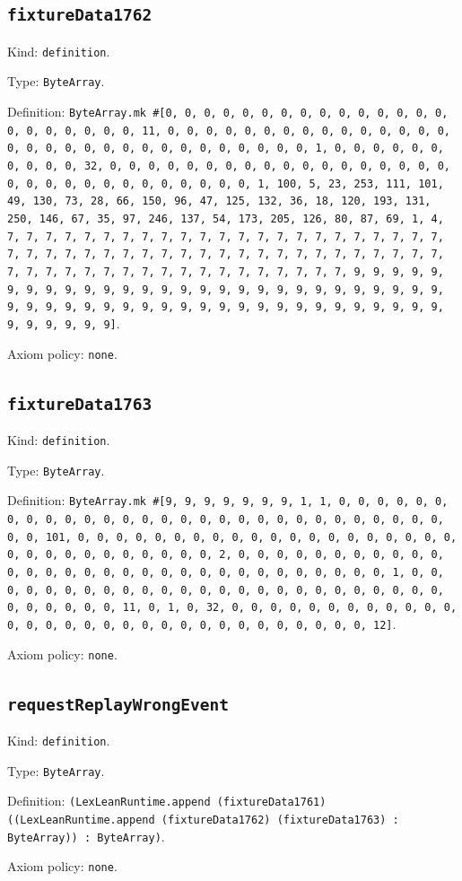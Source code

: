 \documentclass[11pt]{article}
\begin{document}
\subsection*{\texttt{fixtureData1762}}
\noindent Kind: \texttt{definition}.\par
\noindent Type: \texttt{ByteArray}.\par
\noindent Definition: \texttt{ByteArray.mk \#[0, 0, 0, 0, 0, 0, 0, 0, 0, 0, 0, 0, 0, 0, 0, 0, 0, 0, 0, 0, 0, 0, 11, 0, 0, 0, 0, 0, 0, 0, 0, 0, 0, 0, 0, 0, 0, 0, 0, 0, 0, 0, 0, 0, 0, 0, 0, 0, 0, 0, 0, 0, 0, 0, 1, 0, 0, 0, 0, 0, 0, 0, 0, 0, 0, 32, 0, 0, 0, 0, 0, 0, 0, 0, 0, 0, 0, 0, 0, 0, 0, 0, 0, 0, 0, 0, 0, 0, 0, 0, 0, 0, 0, 0, 0, 0, 0, 1, 100, 5, 23, 253, 111, 101, 49, 130, 73, 28, 66, 150, 96, 47, 125, 132, 36, 18, 120, 193, 131, 250, 146, 67, 35, 97, 246, 137, 54, 173, 205, 126, 80, 87, 69, 1, 4, 7, 7, 7, 7, 7, 7, 7, 7, 7, 7, 7, 7, 7, 7, 7, 7, 7, 7, 7, 7, 7, 7, 7, 7, 7, 7, 7, 7, 7, 7, 7, 7, 7, 7, 7, 7, 7, 7, 7, 7, 7, 7, 7, 7, 7, 7, 7, 7, 7, 7, 7, 7, 7, 7, 7, 7, 7, 7, 7, 7, 7, 7, 7, 7, 9, 9, 9, 9, 9, 9, 9, 9, 9, 9, 9, 9, 9, 9, 9, 9, 9, 9, 9, 9, 9, 9, 9, 9, 9, 9, 9, 9, 9, 9, 9, 9, 9, 9, 9, 9, 9, 9, 9, 9, 9, 9, 9, 9, 9, 9, 9, 9, 9, 9, 9, 9, 9, 9, 9, 9, 9]}.\par
\noindent Axiom policy: \texttt{none}.\par
\subsection*{\texttt{fixtureData1763}}
\noindent Kind: \texttt{definition}.\par
\noindent Type: \texttt{ByteArray}.\par
\noindent Definition: \texttt{ByteArray.mk \#[9, 9, 9, 9, 9, 9, 9, 1, 1, 0, 0, 0, 0, 0, 0, 0, 0, 0, 0, 0, 0, 0, 0, 0, 0, 0, 0, 0, 0, 0, 0, 0, 0, 0, 0, 0, 0, 0, 0, 0, 101, 0, 0, 0, 0, 0, 0, 0, 0, 0, 0, 0, 0, 0, 0, 0, 0, 0, 0, 0, 0, 0, 0, 0, 0, 0, 0, 0, 0, 0, 0, 0, 2, 0, 0, 0, 0, 0, 0, 0, 0, 0, 0, 0, 0, 0, 0, 0, 0, 0, 0, 0, 0, 0, 0, 0, 0, 0, 0, 0, 0, 0, 0, 0, 1, 0, 0, 0, 0, 0, 0, 0, 0, 0, 0, 0, 0, 0, 0, 0, 0, 0, 0, 0, 0, 0, 0, 0, 0, 0, 0, 0, 0, 0, 0, 0, 11, 0, 1, 0, 32, 0, 0, 0, 0, 0, 0, 0, 0, 0, 0, 0, 0, 0, 0, 0, 0, 0, 0, 0, 0, 0, 0, 0, 0, 0, 0, 0, 0, 0, 0, 0, 12]}.\par
\noindent Axiom policy: \texttt{none}.\par
\subsection*{\texttt{requestReplayWrongEvent}}
\noindent Kind: \texttt{definition}.\par
\noindent Type: \texttt{ByteArray}.\par
\noindent Definition: \texttt{(LexLeanRuntime.append (fixtureData1761) ((LexLeanRuntime.append (fixtureData1762) (fixtureData1763) : ByteArray)) : ByteArray)}.\par
\noindent Axiom policy: \texttt{none}.\par
\end{document}
